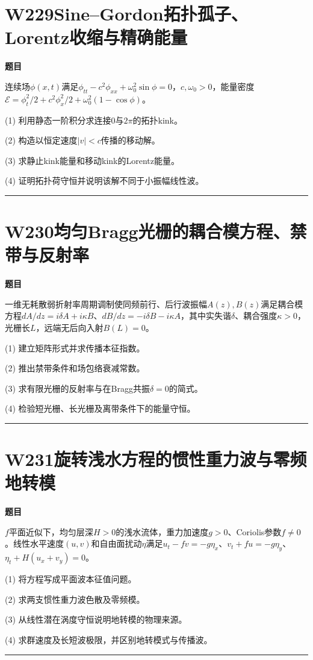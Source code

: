 \documentclass[UTF8,a4paper,11pt,oneside,openany]{ctexbook}
\begin{document}
\section*{W229\quad Sine–Gordon拓扑孤子、Lorentz收缩与精确能量}
\textbf{题目}\par
连续场$\phi(x,t)$满足$\phi_{tt}-c^2\phi_{xx}+\omega_0^2\sin\phi=0$，$c,\omega_0>0$，能量密度$\mathcal E=\phi_t^2/2+c^2\phi_x^2/2+\omega_0^2(1-\cos\phi)$。
\par\smallskip\noindent (1) 利用静态一阶积分求连接0与$2\pi$的拓扑kink。
\par\smallskip\noindent (2) 构造以恒定速度$|v|<c$传播的移动解。
\par\smallskip\noindent (3) 求静止kink能量和移动kink的Lorentz能量。
\par\smallskip\noindent (4) 证明拓扑荷守恒并说明该解不同于小振幅线性波。
\par\medskip\hrule\medskip
\section*{W230\quad 均匀Bragg光栅的耦合模方程、禁带与反射率}
\textbf{题目}\par
一维无耗散弱折射率周期调制使同频前行、后行波振幅$A(z),B(z)$满足耦合模方程$dA/dz=i\delta A+i\kappa B$、$dB/dz=-i\delta B-i\kappa A$，其中实失谐$\delta$、耦合强度$\kappa>0$，光栅长$L$，远端无后向入射$B(L)=0$。
\par\smallskip\noindent (1) 建立矩阵形式并求传播本征指数。
\par\smallskip\noindent (2) 推出禁带条件和场包络衰减常数。
\par\smallskip\noindent (3) 求有限光栅的反射率与在Bragg共振$\delta=0$的简式。
\par\smallskip\noindent (4) 检验短光栅、长光栅及离带条件下的能量守恒。
\par\medskip\hrule\medskip
\section*{W231\quad 旋转浅水方程的惯性重力波与零频地转模}
\textbf{题目}\par
$f$平面近似下，均匀层深$H>0$的浅水流体，重力加速度$g>0$、Coriolis参数$f\ne0$。线性水平速度$(u,v)$和自由面扰动$\eta$满足$u_t-fv=-g\eta_x$、$v_t+fu=-g\eta_y$、$\eta_t+H(u_x+v_y)=0$。
\par\smallskip\noindent (1) 将方程写成平面波本征值问题。
\par\smallskip\noindent (2) 求两支惯性重力波色散及零频模。
\par\smallskip\noindent (3) 从线性潜在涡度守恒说明地转模的物理来源。
\par\smallskip\noindent (4) 求群速度及长短波极限，并区别地转模式与传播波。
\par\medskip\hrule\medskip
\end{document}
